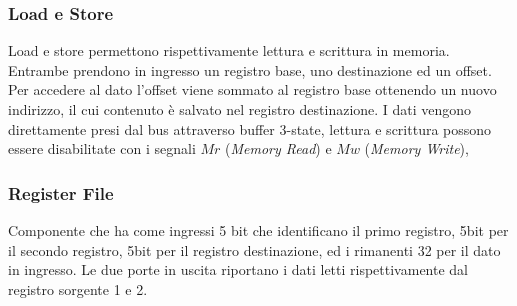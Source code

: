 \documentclass[../ace.tex]{subfiles}
\begin{document}
\subsubsection{Load e Store}
Load e store permettono rispettivamente lettura e scrittura in memoria.
Entrambe prendono in ingresso un registro base, uno destinazione ed un offset. Per accedere al dato l'offset viene sommato
al registro base ottenendo un nuovo indirizzo, il cui contenuto è salvato nel registro destinazione.
I dati vengono direttamente presi dal bus attraverso buffer 3-state, lettura e scrittura possono essere disabilitate con i segnali
$Mr$ (\textit{Memory Read}) e $Mw$ (\textit{Memory Write}),

\subsubsection{Register File}
Componente che ha come ingressi 5 bit che identificano il primo registro, 5bit per il secondo registro,
5bit per il registro destinazione, ed i rimanenti 32 per il dato in ingresso.
Le due porte in uscita riportano i dati letti rispettivamente dal registro sorgente 1 e 2.
\end{document}
